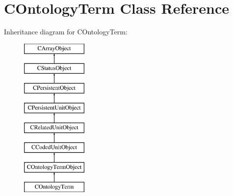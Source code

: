 \hypertarget{class_c_ontology_term}{\section{C\-Ontology\-Term Class Reference}
\label{class_c_ontology_term}
}
Inheritance diagram for C\-Ontology\-Term\-:\begin{figure}[H]
\begin{center}
\leavevmode
\includegraphics[height=8.000000cm]{class_c_ontology_term}
\end{center}
\end{figure}
